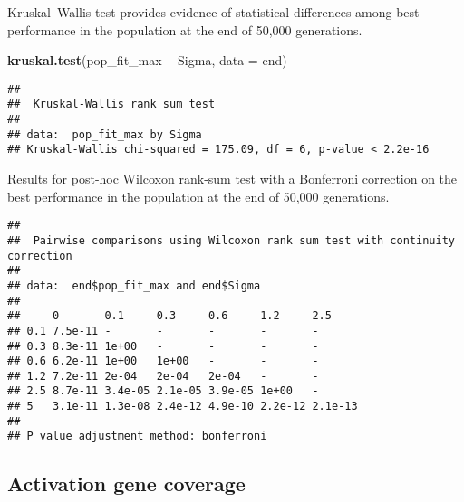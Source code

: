 \documentclass[]{book}
\newenvironment{Shaded}{\begin{snugshade}}{\end{snugshade}}
\newcommand{\DataTypeTok}[1]{\textcolor[rgb]{0.13,0.29,0.53}{#1}}
\newcommand{\KeywordTok}[1]{\textcolor[rgb]{0.13,0.29,0.53}{\textbf{#1}}}
\newcommand{\NormalTok}[1]{#1}
\newcommand{\OperatorTok}[1]{\textcolor[rgb]{0.81,0.36,0.00}{\textbf{#1}}}
\newcommand{\OtherTok}[1]{\textcolor[rgb]{0.56,0.35,0.01}{#1}}
\newcommand{\StringTok}[1]{\textcolor[rgb]{0.31,0.60,0.02}{#1}}
\begin{document}
Kruskal--Wallis test provides evidence of statistical differences among best performance in the population at the end of 50,000 generations.

\begin{Shaded}
\begin{Highlighting}[]
\KeywordTok{kruskal.test}\NormalTok{(pop_fit_max }\OperatorTok{~}\StringTok{ }\NormalTok{Sigma, }\DataTypeTok{data =}\NormalTok{ end)}
\end{Highlighting}
\end{Shaded}

\begin{verbatim}
## 
##  Kruskal-Wallis rank sum test
## 
## data:  pop_fit_max by Sigma
## Kruskal-Wallis chi-squared = 175.09, df = 6, p-value < 2.2e-16
\end{verbatim}

Results for post-hoc Wilcoxon rank-sum test with a Bonferroni correction on the best performance in the population at the end of 50,000 generations.

\begin{Shaded}
\end{Shaded}

\begin{verbatim}
## 
##  Pairwise comparisons using Wilcoxon rank sum test with continuity correction 
## 
## data:  end$pop_fit_max and end$Sigma 
## 
##     0       0.1     0.3     0.6     1.2     2.5    
## 0.1 7.5e-11 -       -       -       -       -      
## 0.3 8.3e-11 1e+00   -       -       -       -      
## 0.6 6.2e-11 1e+00   1e+00   -       -       -      
## 1.2 7.2e-11 2e-04   2e-04   2e-04   -       -      
## 2.5 8.7e-11 3.4e-05 2.1e-05 3.9e-05 1e+00   -      
## 5   3.1e-11 1.3e-08 2.4e-12 4.9e-10 2.2e-12 2.1e-13
## 
## P value adjustment method: bonferroni
\end{verbatim}

\hypertarget{activation-gene-coverage-9}{%
\subsection{Activation gene coverage}\label{activation-gene-coverage-9}}
\end{document}
